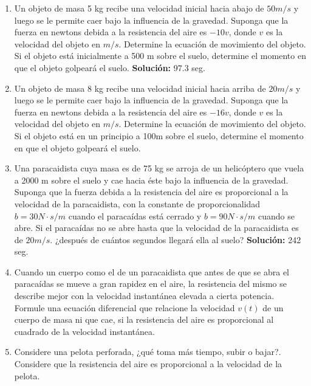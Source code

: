 \documentclass[letterpaper,10pt]{memoir}
\begin{document}
\begin{enumerate}
	\item Un objeto de masa 5 kg recibe una velocidad inicial hacia abajo de \(50 m/s\) y luego se le permite caer bajo la influencia de la gravedad. Suponga que la fuerza en newtons debida a la resistencia del aire es \(-10v\), donde \(v\) es la velocidad del objeto en \(m/s\). Determine la ecuación de movimiento del objeto. Si el objeto está inicialmente a 500 m sobre el suelo, determine el momento en que el objeto golpeará el suelo. \textbf{Solución:} 97.3 seg.
	\item Un objeto de masa 8 kg recibe una velocidad inicial hacia arriba de \(20 m/s\) y luego se le permite caer bajo la influencia de la gravedad. Suponga que la fuerza en newtons debida a la resistencia del aire es \(-16v\), donde \(v\) es la velocidad del objeto en \(m/s\). Determine la ecuación de movimiento del objeto. Si el objeto está en un principio a 100m sobre el suelo, determine el momento en que el objeto golpeará el suelo.
	\item Una paracaidista cuya masa es de 75 kg se arroja de un helicóptero que vuela a 2000 m sobre el suelo y cae hacia éste bajo la influencia de la gravedad. Suponga que la fuerza debida a la resistencia del aire es proporcional a la velocidad de la paracaidista, con la constante de proporcionalidad \(b = 30 N \cdot s/m\) cuando el paracaídas está cerrado y \(b = 90 N \cdot s/m\) cuando se abre. Si el paracaídas no se abre hasta que la velocidad de la paracaidista es de \(20 m/s\). ¿después de cuántos segundos llegará ella al suelo? \textbf{Solución:} 242 seg.
	\item Cuando un cuerpo como el de un paracaidista que antes de que se abra el paracaídas se mueve a gran rapidez en el aire, la resistencia del mismo se describe mejor con la velocidad instantánea elevada a cierta potencia. Formule una ecuación diferencial que relacione la velocidad \(v(t)\) de un cuerpo de masa ni que cae, si la resistencia del aire es proporcional al cuadrado de la velocidad instantánea.
	\item Considere una pelota perforada, ¿qué toma más tiempo, subir o bajar?. Considere que la resistencia del aire es proporcional a la velocidad de la pelota.
\end{enumerate}
\end{document}
